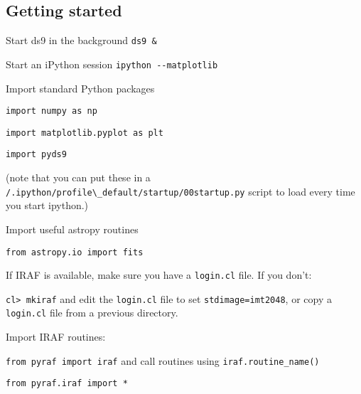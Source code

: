 \documentclass{article}
\begin{document}
\subsection*{Getting started}
\begin{enumerate*}
\item Start ds9 in the background \verb|ds9 &|
\item Start an iPython session \verb|ipython --matplotlib|
\item Import standard Python packages
    \begin{itemize*}
        \item \verb|import numpy as np|
        \item \verb|import matplotlib.pyplot as plt|
        \item \verb|import pyds9|
    \end{itemize*}
(note that you can put these in a
\verb|/.ipython/profile\_default/startup/00startup.py|
script to load every time you start ipython.)
\item Import useful astropy routines
    \begin{itemize*}
        \item \verb|from astropy.io import fits|
    \end{itemize*}
\item If IRAF is available, make sure you have a \verb|login.cl|
    file. If you don't:
    \begin{itemize*}
        \item \verb|cl> mkiraf| and edit the \verb|login.cl|
            file to set \verb|stdimage=imt2048|,
            or copy a \verb|login.cl| file from a previous directory.
    \end{itemize*}
\item Import IRAF routines:
    \begin{itemize*}
        \item \verb|from pyraf import iraf| and call routines using
            \verb|iraf.routine_name()|
        \item \verb|from pyraf.iraf import *|
    \end{itemize*}
\end{enumerate*}
\end{document}
